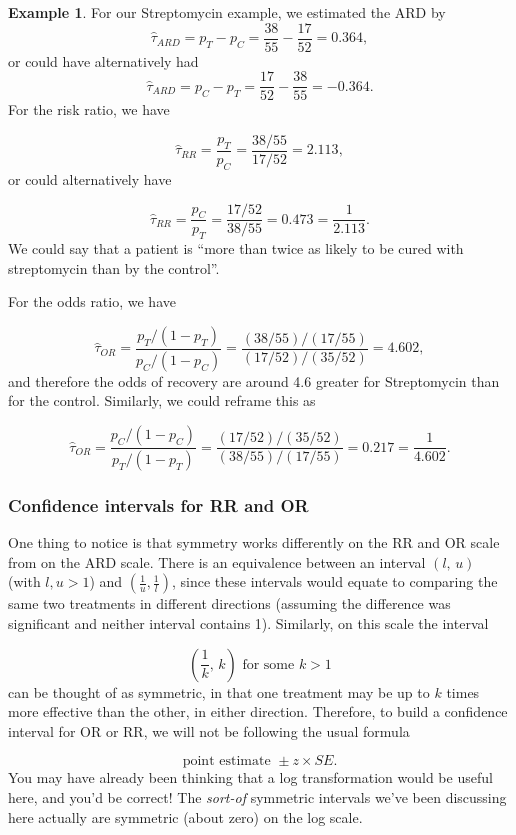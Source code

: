 \documentclass[
  openany]{book}
\theoremstyle{definition}
\theoremstyle{definition}
\newtheorem{example}{Example}[chapter]
\theoremstyle{definition}
\theoremstyle{definition}
\theoremstyle{remark}
\begin{document}
\begin{example}
For our Streptomycin example, we estimated the ARD by
\[\hat\tau_{ARD}=p_T - p_C = \frac{38}{55} - \frac{17}{52} = 0.364,\]
or could have alternatively had
\[\hat\tau_{ARD}=p_C - p_T = \frac{17}{52} - \frac{38}{55} = - 0.364.\]
For the risk ratio, we have

\[\hat{\tau}_{RR} = \frac{p_T}{p_C} = \frac{38/55}{17/52} = 2.113,\]
or could alternatively have

\[\hat{\tau}_{RR} = \frac{p_C}{p_T} = \frac{17/52}{38/55} = 0.473 = \frac{1}{2.113}.\]
We could say that a patient is ``more than twice as likely to be cured with streptomycin than by the control''.

For the odds ratio, we have

\[\hat{\tau}_{OR} = \frac{p_T/\left(1-p_T\right)}{p_C/\left(1-p_C\right)} = \frac{(38/55)/(17/55)}{(17/52)/(35/52)} = 4.602, \]
and therefore the odds of recovery are around 4.6 greater for Streptomycin than for the control. Similarly, we could reframe this as

\[\hat{\tau}_{OR} = \frac{p_C/\left(1-p_C\right)}{p_T/\left(1-p_T\right)} = \frac{(17/52)/(35/52)}{(38/55)/(17/55)} = 0.217 = \frac{1}{4.602}.\]
\end{example}

\subsubsection{Confidence intervals for RR and OR}\label{ci-rr}

One thing to notice is that symmetry works differently on the RR and OR scale from on the ARD scale. There is an equivalence between an interval \(\left(l,\,u\right)\) (with \(l,u>1\)) and \(\left(\frac{1}{u},\frac{1}{l}\right)\), since these intervals would equate to comparing the same two treatments in different directions (assuming the difference was significant and neither interval contains 1). Similarly, on this scale the interval

\[\left(\frac{1}{k},\,k\right) \text{ for some }k>1 \]
can be thought of as symmetric, in that one treatment may be up to \(k\) times more effective than the other, in either direction. Therefore, to build a confidence interval for OR or RR, we will not be following the usual formula

\[\text{point estimate } \pm{z\times{SE}}.\]
You may have already been thinking that a log transformation would be useful here, and you'd be correct! The \emph{sort-of} symmetric intervals we've been discussing here actually are symmetric (about zero) on the log scale.
\end{document}
